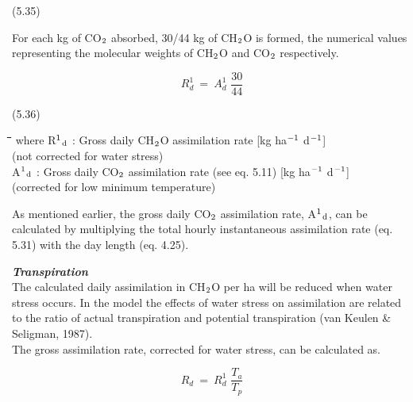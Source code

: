  
\strut\hfill (5.35)



For each kg of CO$_{{\rm 2}}$ absorbed, 30/44 kg of CH$_{{\rm 2}}$O is formed, the numerical values
representing the molecular weights of CH$_{{\rm 2}}$O and CO$_{{\rm 2}}$ respectively.

\begin{displaymath}
R _{d}^{1} ~=~ A _{d}^{1} \,\,{\frac{30}{44}}
\end{displaymath}

 
\strut\hfill (5.36)

\nwln
\begin{tabbing}
\hspace{1.27cm}\=\hspace{1.27cm}\=\hspace{1.27cm}\=\hspace{1.27cm}\=%
\hspace{1.27cm}\=\hspace{1.27cm}\=\hspace{1.27cm}\=\hspace{1.27cm}\=%
\hspace{1.27cm}\=\hspace{1.27cm}\=\kill
where R$^{{\rm 1}}$$_{{\rm d}}$ : Gross daily CH$_{{\rm 2}}$O assimilation rate        [kg ha$^{{\rm -1}}$ d$^{{\rm -1}}$]\\
   (not corrected for water stress)\\
A$^{{\rm 1}}$$_{{\rm d}}$ : Gross daily CO$_{{\rm 2}}$ assimilation rate (see eq. 5.11)        [kg ha$^{{\rm -1}}$ d$^{{\rm -1}}$]\\
   (corrected for low minimum temperature)
\end{tabbing}

 
As mentioned earlier, the gross daily CO$_{{\rm 2}}$ assimilation rate, A$^{{\rm 1}}$$_{{\rm d}}$, can be calculated by
multiply\-ing the total hourly instantaneous assimilation rate (eq. 5.31) with the day length
(eq. 4.25). 

{\bf {\it Transpiration\/}}\\
The calculated daily assimilation in CH$_{{\rm 2}}$O per ha will be reduced when water stress
occurs. In the model the effects of water stress on assimilation are related to the ratio of
actual transpiration and potential transpiration (van Keulen \& Seligman, 1987).\\
The gross assimilation rate, corrected for water stress, can be calculated as.

\begin{displaymath}
R _{d} ~=~ R _{d}^{1} \,\,{\frac{T _{a} }{T _{p} }}
\end{displaymath}

